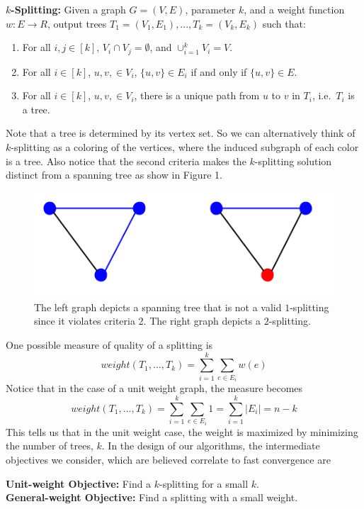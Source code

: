 \documentclass{article} %
\begin{document}
\noindent\textbf{$k$-Splitting:} Given a graph $G=(V,E)$, parameter $k$, and a weight function $w:E\rightarrow R$, output trees $T_1=(V_1,E_1),...,T_k=(V_k,E_k)$ such that:
\begin{enumerate}
\item For all $i,j\in[k]$, $V_i\cap V_j=\emptyset$, and $\cup_{i=1}^k V_i=V$.
\item For all $i\in[k]$, $u,v,\in V_i$, $\{u,v\}\in E_i$ if and only if $\{u,v\}\in E$.
\item For all $i\in[k]$, $u,v,\in V_i$, there is a unique path from $u$ to $v$ in $T_i$, i.e.~$T_i$ is a tree.
\end{enumerate}
Note that a tree is determined by its vertex set. So we can alternatively think of $k$-splitting as a coloring of the vertices, where the induced subgraph of each color is a tree. Also notice that the second criteria makes the $k$-splitting solution distinct from a spanning tree as show in Figure 1.
\begin{figure}
\begin{center}\includegraphics[scale=.5]{STvKS.png}\end{center}
\caption{The left graph depicts a spanning tree that is not a valid $1$-splitting since it violates criteria 2. The right graph depicts a $2$-splitting.}
\end{figure}

One possible measure of quality of a splitting is
\[
weight(T_1,...,T_k)=\sum_{i=1}^k\sum_{e\in E_i}w(e)
\]
Notice that in the case of a unit weight graph, the measure becomes
\[
weight(T_1,...,T_k)=\sum_{i=1}^k\sum_{e\in E_i}1=\sum_{i=1}^k|E_i|=n-k
\]
This tells us that in the unit weight case, the weight is maximized by minimizing the number of trees, $k$. In the design of our algorithms, the intermediate objectives we consider, which are believed correlate to fast convergence are 

\noindent\textbf{Unit-weight Objective:} Find a $k$-splitting for a small $k$.\\
\noindent\textbf{General-weight Objective:} Find a splitting with a small weight.
\end{document}
